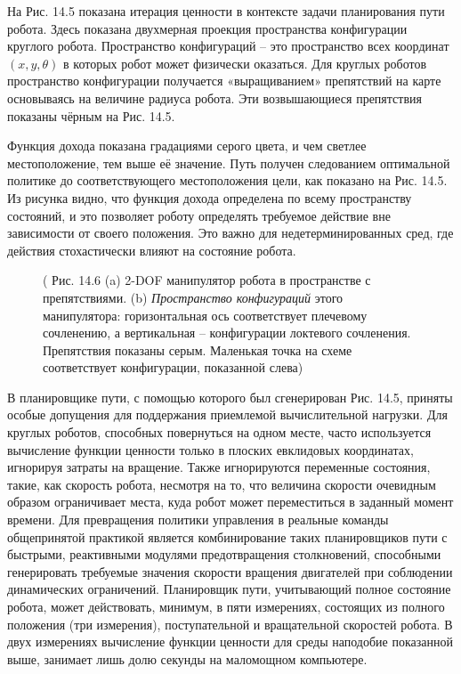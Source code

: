 \documentclass[10pt,a4paper]{article}
\begin{document}
На Рис. 14.5 показана итерация ценности в контексте задачи планирования пути робота. Здесь показана двухмерная проекция пространства конфигурации круглого робота. Пространство конфигураций – это пространство всех координат $(x, y, \theta)$ в которых робот может физически оказаться. Для круглых роботов пространство конфигурации получается «выращиванием» препятствий на карте основываясь на величине радиуса робота. Эти возвышающиеся препятствия показаны чёрным на Рис. 14.5.

Функция дохода показана градациями серого цвета, и чем светлее местоположение, тем выше её значение. Путь получен следованием оптимальной политике до соответствующего местоположения цели, как показано на Рис. 14.5. Из рисунка видно, что функция дохода определена по всему пространству состояний, и это позволяет роботу определять требуемое действие вне зависимости от своего положения. Это важно для недетерминированных сред, где действия стохастически влияют на состояние робота.

\begin{figure}[H]
	\caption{ ( Рис. 14.6 (a) 2-DOF манипулятор робота в пространстве с препятствиями. (b) \textit{Пространство конфигураций} этого манипулятора: горизонтальная ось соответствует плечевому сочленению, а вертикальная – конфигурации локтевого сочленения. Препятствия показаны серым. Маленькая точка на схеме соответствует конфигурации, показанной слева) }
	\label{fig:146orig}
\end{figure}

В планировщике пути, с помощью которого был сгенерирован Рис. 14.5, приняты особые допущения для поддержания приемлемой вычислительной нагрузки. Для круглых роботов, способных повернуться на одном месте, часто используется вычисление функции ценности только в плоских евклидовых координатах, игнорируя затраты на вращение. Также игнорируются переменные состояния, такие, как скорость робота, несмотря на то, что величина скорости очевидным образом ограничивает места, куда робот может переместиться в заданный момент времени. Для превращения политики управления в реальные команды общепринятой практикой является комбинирование таких планировщиков пути с быстрыми, реактивными модулями предотвращения столкновений, способными генерировать требуемые значения скорости вращения двигателей при соблюдении динамических ограничений. Планировщик пути, учитывающий полное состояние робота, может действовать, минимум, в пяти измерениях, состоящих из полного положения (три измерения), поступательной и вращательной скоростей робота. В двух измерениях вычисление функции ценности для среды наподобие показанной выше, занимает лишь долю секунды на маломощном компьютере.
\end{document}
